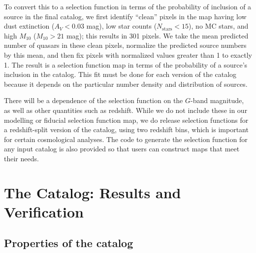 To convert this to a selection function in terms of the probability of inclusion of a source in the final catalog, we first identify ``clean'' pixels in the map having low dust extinction ($A_V < 0.03$ mag), low star counts ($N_\mathrm{stars} < 15$), no MC stars, and high $M_{10}$ ($M_{10} > 21$ mag); this results in 301 pixels.
We take the mean predicted number of quasars in these clean pixels, normalize the predicted source numbers by this mean, and then fix pixels with normalized values greater than 1 to exactly 1.
The result is a selection function map in terms of the probability of a source's inclusion in the catalog.
This fit must be done for each version of the catalog because it depends on the particular number density and distribution of sources.

There will be a dependence of the selection function on the $G$-band magnitude, as well as other quantities such as redshift.
While we do not include these in our modelling or fiducial selection function map, we do release selection functions for a redshift-split version of the catalog, using two redshift bins, which is important for certain cosmological analyses.
The code to generate the selection function for any input catalog is also provided so that users can construct maps that meet their needs.


\section{The Catalog: Results and Verification}
\label{sec:catalog}

\subsection{Properties of the catalog}
\label{sec:properties}

